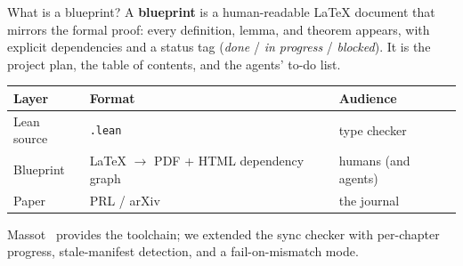 \documentclass[aspectratio=169,10pt]{beamer}
\begin{document}
\begin{frame}{What is a blueprint?}
    A \textbf{blueprint} is a human-readable LaTeX document that mirrors the formal proof: every definition, lemma, and theorem appears, with explicit dependencies and a status tag (\emph{done} / \emph{in progress} / \emph{blocked}). It is the project plan, the table of contents, and the agents' to-do list.
    \vspace{0.6em}
    \begin{center}
    \renewcommand{\arraystretch}{1.3}
    {\footnotesize
    \begin{tabular}{@{}lll@{}}
        \toprule
        \textbf{Layer} & \textbf{Format} & \textbf{Audience} \\
        \midrule
        Lean source    & \texttt{.lean}                          & type checker \\
        Blueprint      & LaTeX $\to$ PDF + HTML dependency graph & humans (and agents) \\
        Paper          & PRL / arXiv                             & the journal \\
        \bottomrule
    \end{tabular}}
    \end{center}
    \vspace{0.6em}
    \textcolor{dimwhite}{\footnotesize Massot~\cite{Massot2021Leanblueprint} provides the toolchain; we extended the sync checker with per-chapter progress, stale-manifest detection, and a fail-on-mismatch mode.}
\end{frame}
\end{document}
